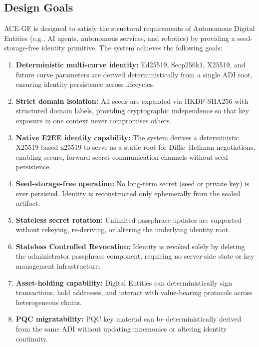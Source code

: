 \documentclass[12pt,a4paper]{article}
\begin{document}
  \subsection{Design Goals}

  ACE-GF is designed to satisfy the structural requirements of Autonomous Digital Entities (e.g., AI agents, autonomous services, and robotics) by providing a seed-storage-free identity primitive. The system achieves the following goals:

  \begin{enumerate}
   \item \textbf{Deterministic multi-curve identity:}
   Ed25519, Secp256k1, X25519, and future curve parameters are derived deterministically
   from a single ADI root, ensuring identity persistence across lifecycles.

   \item \textbf{Strict domain isolation:}
   All seeds are expanded via HKDF-SHA256 with structured domain labels,
   providing cryptographic independence so that key exposure in one context
   never compromises others.

   \item \textbf{Native E2EE identity capability:}
   The system derives a deterministic X25519-based x25519 to serve as a
   static root for Diffie--Hellman negotiations, enabling secure, forward-secret
   communication channels without seed persistence.

   \item \textbf{Seed-storage-free operation:}
   No long-term secret (seed or private key) is ever persisted. Identity is
   reconstructed only ephemerally from the sealed artifact.

   \item \textbf{Stateless secret rotation:}
   Unlimited passphrase updates are supported without rekeying, re-deriving,
   or altering the underlying identity root.

   \item \textbf{Stateless Controlled Revocation:}
   Identity is revoked solely by deleting the administrator passphrase component,
   requiring no server-side state or key management infrastructure.

   \item \textbf{Asset-holding capability:}
   Digital Entities can deterministically sign transactions, hold addresses,
   and interact with value-bearing protocols across heterogeneous chains.

   \item \textbf{PQC migratability:}
   PQC key material can be deterministically derived from the same ADI
   without updating mnemonics or altering identity continuity.
  \end{enumerate}
\end{document}
